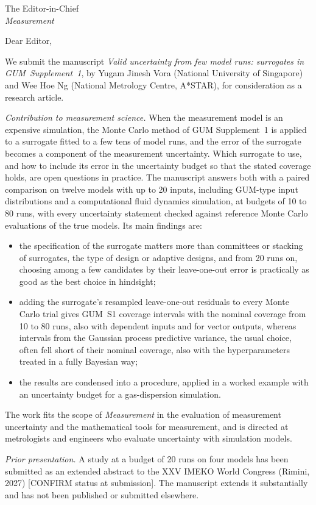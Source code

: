 \documentclass[11pt,a4paper]{letter}
\begin{document}
\begin{letter}{The Editor-in-Chief\\\emph{Measurement}}
\opening{Dear Editor,}

We submit the manuscript \emph{Valid uncertainty from few model runs: surrogates in GUM~Supplement~1}, by Yugam Jinesh Vora (National
University of Singapore) and Wee Hoe Ng (National Metrology Centre,
A*STAR), for consideration as a research article.

\emph{Contribution to measurement science.} When the measurement model is
an expensive simulation, the Monte Carlo method of GUM Supplement~1 is
applied to a surrogate fitted to a few tens of model runs, and the error of
the surrogate becomes a component of the measurement uncertainty. Which
surrogate to use, and how to include its error in the uncertainty budget so
that the stated coverage holds, are open questions in practice. The
manuscript answers both with a paired comparison on twelve models with up
to 20 inputs, including GUM-type input distributions and a computational
fluid dynamics simulation, at budgets of 10 to 80 runs, with every
uncertainty statement checked against reference Monte Carlo evaluations of
the true models. Its main findings are:
\begin{itemize}
\item the specification of the surrogate matters more than committees or
stacking of surrogates, the type of design or adaptive designs, and from
20 runs on, choosing among a few candidates by their leave-one-out error is
practically as good as the best choice in hindsight;
\item adding the surrogate's resampled leave-one-out residuals to every
Monte Carlo trial gives GUM~S1 coverage intervals with the nominal
coverage from 10 to 80 runs, also with dependent inputs and for vector
outputs, whereas intervals from the Gaussian process predictive variance,
the usual choice, often fell short of their nominal coverage, also with the
hyperparameters treated in a fully Bayesian way;
\item the results are condensed into a procedure, applied in a worked
example with an uncertainty budget for a gas-dispersion simulation.
\end{itemize}
The work fits the scope of \emph{Measurement} in the evaluation of
measurement uncertainty and the mathematical tools for measurement, and is
directed at metrologists and engineers who evaluate uncertainty with
simulation models.

\emph{Prior presentation.} A study at a budget of 20 runs on four models
has been submitted as an extended abstract to the XXV IMEKO World Congress
(Rimini, 2027) [CONFIRM status at submission]. The manuscript extends it
substantially and has not been published or submitted elsewhere.


\end{letter}
\end{document}
